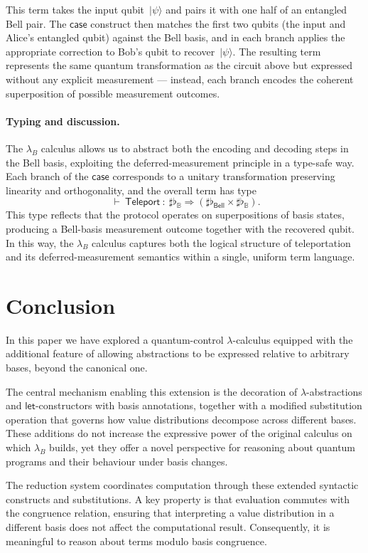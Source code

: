 \documentclass[runningheads,orivec,envcountsame,envcountsect]{llncs}
\newcommand\ket[1]{\ensuremath{|#1\rangle}}
\def\Arr{\Rightarrow}
\def\TYP#1#2#3{#1~{\vdash}~#2~{:}~#3}
\newcommand\B{\mathbb B}
\newcommand{\Bell}{\mathsf{Bell}}
\newcommand{\lambdaB}{\lambda_B}
\newcommand\basis[1]{\ensuremath{\flat_{#1}}}
\begin{document}
This term takes the input qubit~$\ket{\psi}$ and pairs it with one half of an
entangled Bell pair.  The $\mathsf{case}$ construct then matches the first two
qubits (the input and Alice's entangled qubit) against the Bell basis, and in
each branch applies the appropriate correction to Bob's qubit to
recover~$\ket{\psi}$.  The resulting term represents the same quantum
transformation as the circuit above but expressed without any explicit
measurement --- instead, each branch encodes the coherent superposition of
possible measurement outcomes.

\paragraph{Typing and discussion.}
The $\lambdaB$ calculus allows us to abstract both the encoding and decoding
steps in the Bell basis, exploiting the deferred-measurement principle in a
type-safe way.  
Each branch of the $\mathsf{case}$ corresponds to a unitary transformation
preserving linearity and orthogonality, and the overall term has type
\[
  \TYP{}{\mathsf{Teleport}}
  {\sharp\basis{\B}\Arr(\sharp\basis{\Bell}\times\sharp\basis{\B})}.
\]
This type reflects that the protocol operates on superpositions of basis
states, producing a Bell-basis measurement outcome together with the recovered
qubit.  
In this way, the $\lambdaB$ calculus captures both the logical structure of
teleportation and its deferred-measurement semantics within a single, uniform
term language.

\section{Conclusion}\label{sec:conclusion}

In this paper we have explored a quantum-control $\lambda$-calculus equipped
with the additional feature of allowing abstractions to be expressed relative
to arbitrary bases, beyond the canonical one.  

The central mechanism enabling this extension is the decoration of
$\lambda$-ab\-strac\-tions and $\mathsf{let}$-constructors with basis annotations,
together with a modified substitution operation that governs how value
distributions decompose across different bases.  
These additions do not increase the expressive power of the original calculus
on which $\lambdaB$ builds, yet they offer a novel perspective for reasoning
about quantum programs and their behaviour under basis changes.

The reduction system coordinates computation through these extended syntactic
constructs and substitutions.  
A key property is that evaluation commutes with the congruence relation,
ensuring that interpreting a value distribution in a different basis does not
affect the computational result.  
Consequently, it is meaningful to reason about terms modulo basis
congruence.
\end{document}
